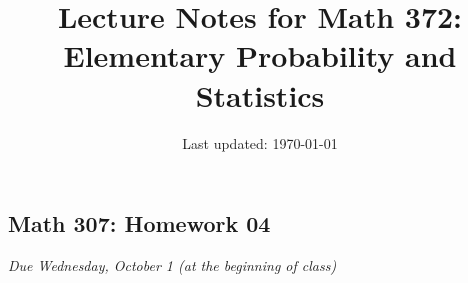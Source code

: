 \documentclass[10pt]{article}
\title{Lecture Notes for Math 372: \\Elementary Probability and Statistics}
\date{Last updated: \today}
\theoremstyle{definition}
\newtheorem{problem}[theorem]{Problem}
\newcommand{\1}[1]{\textbf{1}_{\left[#1\right]}} %
\newcommand{\dempfcolor}[1]{{\color{RoyalBlue}#1}}
\newcommand{\demph}[1]{\dempfcolor{{\sl #1}}}
\begin{document}
\begin{center}
  \section*{Math 307: Homework 04}
  \textit{Due Wednesday, October 1 (at the beginning of class)}
\end{center}


\end{document}
